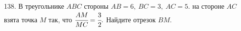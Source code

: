138. В треугольнике $ABC$ стороны $AB=6,\ BC=3,\ AC=5.$ на стороне $AC$ взята точка $M$ так, что $\cfrac{AM}{MC}=\cfrac{3}{2}.$ Найдите отрезок $BM.$\\
